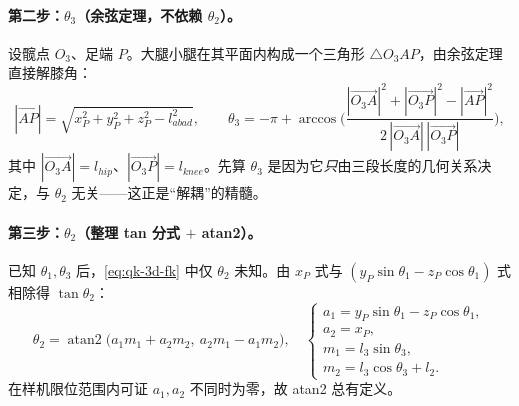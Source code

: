 \paragraph{第二步：$\theta_3$（余弦定理，不依赖 $\theta_2$）。}
设髋点 $O_3$、足端 $P$。大腿小腿在其平面内构成一个三角形 $\triangle O_3 A P$，由余弦定理直接解膝角\cite{unitree2023quadruped}：
\begin{equation}
  |\overrightarrow{AP}|=\sqrt{x_P^2+y_P^2+z_P^2-l_{abad}^2},
  \qquad
  \theta_3=-\pi+\arccos\!\Big(\frac{|\overrightarrow{O_3A}|^2+|\overrightarrow{O_3P}|^2-|\overrightarrow{AP}|^2}{2\,|\overrightarrow{O_3A}|\,|\overrightarrow{O_3P}|}\Big),
  \label{eq:qk-ik-theta3}
\end{equation}
其中 $|\overrightarrow{O_3A}|=l_{hip}$、$|\overrightarrow{O_3P}|=l_{knee}$。先算 $\theta_3$ 是因为它\emph{只}由三段长度的几何关系决定，与 $\theta_2$ 无关——这正是“解耦”的精髓。

\paragraph{第三步：$\theta_2$（整理 tan 分式 $+$ atan2）。}
已知 $\theta_1,\theta_3$ 后，\cref{eq:qk-3d-fk} 中仅 $\theta_2$ 未知。由 $x_P$ 式与 $(y_P\sin\theta_1-z_P\cos\theta_1)$ 式相除得 $\tan\theta_2$\cite{unitree2023quadruped}：
\begin{equation}
  \theta_2=\operatorname{atan2}\big(a_1 m_1+a_2 m_2,\ a_2 m_1-a_1 m_2\big),
  \quad
  \begin{cases}
    a_1=y_P\sin\theta_1-z_P\cos\theta_1,\\
    a_2=x_P,\\
    m_1=l_3\sin\theta_3,\\
    m_2=l_3\cos\theta_3+l_2.
  \end{cases}
  \label{eq:qk-ik-theta2}
\end{equation}
在样机限位范围内可证 $a_1,a_2$ 不同时为零，故 atan2 总有定义\cite{unitree2023quadruped}。

